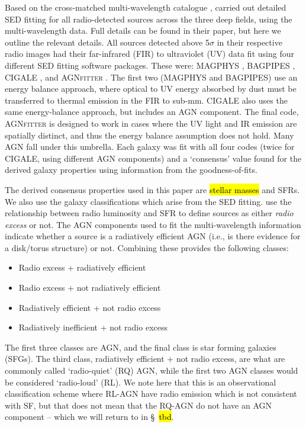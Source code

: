 \documentclass[usenatbib,fleqn,letters]{mnras}
\begin{document}
Based on the cross-matched multi-wavelength catalogue \citep{kondapally_lofar_2021}, \cite[][hereafter, B23]{best_lofar_2023} carried out detailed SED fitting for all radio-detected sources across the three deep fields, using the multi-wavelength data. Full details can be found in their paper, but here we outline the relevant details. All sources detected above 5$\sigma$ in their respective radio images had their far-infrared (FIR) to ultraviolet (UV) data fit using four different SED fitting software packages. These were: MAGPHYS \citep{da_cunha_simple_2008}, BAGPIPES \citep{carnall_inferring_2018,carnall_how_2019}, CIGALE \citep{burgarella_star_2005,noll_analysis_2009,boquien_cigale_2019}, and AGN\textsc{fitter} \citep{calistro_rivera_agnfitter_2016}. The first two (MAGPHYS and BAGPIPES) use an energy balance approach, where optical to UV energy absorbed by dust must be transferred to thermal emission in the FIR to sub-mm.  CIGALE also uses the same energy-balance approach, but includes an AGN component. The final code, AGN\textsc{fitter} is designed to work in cases where the UV light and IR emission are spatially distinct, and thus the energy balance assumption does not hold. Many AGN fall under this umbrella. Each galaxy was fit with all four codes (twice for CIGALE, using different AGN components) and a `consensus' value found for the derived galaxy properties using information from the goodness-of-fits.  

The derived consensus properties used in this paper are \hl{stellar masses} and SFRs. We also use the galaxy classifications which arise from the SED fitting.  use the relationship between radio luminosity and SFR to define sources as either \textit{radio excess} or not. The AGN components used to fit the multi-wavelength information indicate whether a source is a radiatively efficient AGN (i.e., is there evidence for a disk/torus structure) or not. Combining these provides the following classes:
\begin{itemize}
    \item Radio excess + radiatively efficient
    \item Radio excess + not radiatively efficient
    \item Radiatively efficient + not radio excess
    \item Radiatively inefficient + not radio excess
\end{itemize}
The first three classes are AGN, and the final class is star forming galaxies (SFGs). The third class, radiatively efficient + not radio excess, are what are commonly called `radio-quiet' (RQ) AGN, while the first two AGN classes would be considered `radio-loud' (RL).  We note here that this is an observational classification scheme where RL-AGN have radio emission which is not consistent with SF, but that does not mean that the RQ-AGN do not have an AGN component -- which we will return to in \S~\hl{tbd}. 
\end{document}
